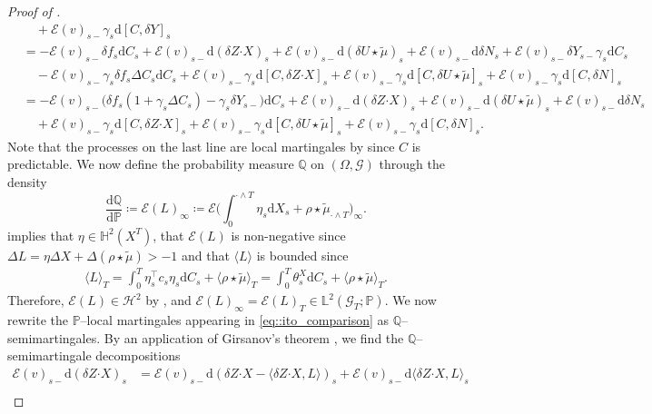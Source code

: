 \documentclass[10pt]{article} %
\newcommand\cE{\mathcal E}
\newcommand\cG{\mathcal G}
\newcommand\cH{\mathcal H}
\def \H{\mathbb{H}}
\def \L{\mathbb{L}}
\def \P{\mathbb{P}}
\def \Q{\mathbb{Q}}
\newcommand{\bcdot}{\boldsymbol{\cdot}}
\newcommand{\1}{\mathbf{1}}
\def\d{\mathrm{d}}
\begin{document}
\begin{proof}[Proof of ]
\begin{align}
		&\quad + \cE(v)_{s-}\gamma_s\d [C,\delta Y]_s \nonumber\\
		&= -\cE(v)_{s-} \delta f_s \d C_s + \cE(v)_{s-} \d(\delta Z \bcdot X)_s + \cE(v)_{s-}\d (\delta U \star\tilde\mu)_s + \cE(v)_{s-}\d \delta N_s + \cE(v)_{s-}\delta Y_{s-}\gamma_s\d C_s \nonumber\\
		&\quad - \cE(v)_{s-}\gamma_s\delta f_s \Delta C_s \d C_s + \cE(v)_{s-}\gamma_s \d [C,\delta Z \bcdot X]_s + \cE(v)_{s-}\gamma_s \d [C,\delta U \star\tilde\mu]_s + \cE(v)_{s-}\gamma_s \d [C,\delta N]_s \nonumber\\
		&= - \cE(v)_{s-} \big(\delta f_s(1+\gamma_s\Delta C_s) - \gamma_s\delta Y_{s-}\big)\d C_s + \cE(v)_{s-} \d(\delta Z \bcdot X)_s + \cE(v)_{s-}\d (\delta U \star\tilde\mu)_s + \cE(v)_{s-}\d \delta N_s \nonumber\\
		&\quad + \cE(v)_{s-}\gamma_s \d [C,\delta Z \bcdot X]_s + \cE(v)_{s-}\gamma_s \d [C,\delta U \star\tilde\mu]_s + \cE(v)_{s-}\gamma_s \d [C,\delta N]_s.
	\end{align}
	Note that the processes on the last line are local martingales by \cite[Proposition I.4.49.(c)]{jacod2003limit} since $C$ is predictable. We now define the probability measure $\Q$ on $(\Omega,\cG)$ through the density
	\begin{equation}\label{eq::stoch_exp_measure_change}
		\frac{\d\Q}{\d\P} \coloneqq \cE(L)_\infty \coloneqq \cE\bigg(\int_0^{\cdot \land T}\eta_s\d X_s + \rho \star \tilde\mu_{\cdot \land T}\bigg)_\infty.
	\end{equation}
	 implies that $\eta \in \H^2(X^T)$, that $\cE(L)$ is non-negative since $\Delta L = \eta \Delta X + \Delta (\rho\star\tilde\mu) > -1$ and that $\langle L \rangle$ is bounded since
	\begin{align*}
		\langle L \rangle_T = \int_0^T \eta^\top_s c_s \eta_s \d C_s + \langle \rho\star\tilde\mu\rangle_T = \int_0^T \theta^X_s \d C_s + \langle \rho\star\tilde\mu\rangle_T.
	\end{align*}
	Therefore, $\cE(L) \in \cH^2$ by , and $\cE(L)_\infty = \cE(L)_T \in \L^2(\cG_T;\P)$. We now rewrite the $\P$--local martingales appearing in \eqref{eq::ito_comparison} as $\Q$--semimartingales. By an application of Girsanov's theorem \cite[Proposition 7.25 and 7.26]{jacod1979calcul}, we find the $\Q$--semimartingale decompositions
	\begingroup
	\allowdisplaybreaks
	\begin{align*}
		\cE(v)_{s-} \d (\delta Z \bcdot X)_s 
		&= \cE(v)_{s-}\d (\delta Z\bcdot X - \langle \delta Z \bcdot X,L \rangle)_s + \cE(v)_{s-}\d\langle \delta Z \bcdot X,L \rangle_s \\

\end{align*}
\end{proof}
\end{document}

